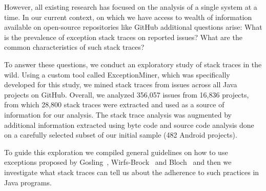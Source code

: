 \documentclass[conference]{IEEEtran}
\begin{document}
However, all existing research has focused on the analysis of a single system at a time. In
our current context, on which we have access to wealth of information available
on open-source repositories like GitHub additional questions arise: What is the
prevalence of exception stack traces on reported issues? What are the common
characteristics of such stack traces?



To answer these questions, we conduct an exploratory study of stack traces in
the wild. Using a custom tool called ExceptionMiner, which was specifically
developed for this study, we mined stack traces from issues across all Java
projects on GitHub. Overall, we analyzed 356,057 issues from 16,836 projects,
from which 28,800 stack traces were extracted and used as a source of
information for our analysis. The stack trace analysis  was augmented by
additional information extracted using byte code and source code analysis done
on a carefully selected subset of our initial sample (482 Android projects).

To guide this exploration we compiled general guidelines on how to use
exceptions proposed by Gosling~\cite{gosling2000java},
Wirfs-Brock~\cite{wirfs2006toward} and Bloch~\cite{bloch2008effective} and then
we investigate what stack traces can tell us about the adherence to such
practices in Java programs.


\end{document}
